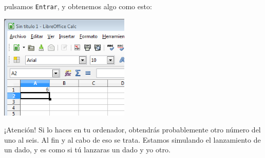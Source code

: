 \documentclass[10pt,a4paper]{article}\usepackage[]{graphicx}\usepackage[]{color}
\begin{document}
pulsamos {\tt Entrar}, y obtenemos algo como esto:
    \begin{center}
    \includegraphics[height=5cm]{../fig/Tut01-Calc-Formula-11.png}
    \end{center}
¡Atención! Si lo haces en tu ordenador, obtendrás probablemente otro número del uno al seis. Al fin y al cabo de eso se trata. Estamos simulando el lanzamiento de un dado, y es como si tú lanzaras un dado y yo otro.
\end{document}
